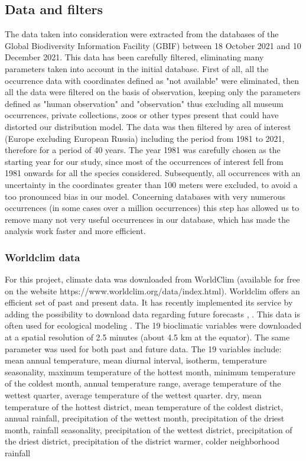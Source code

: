 \documentclass[12pt,a4paper]{article}
\begin{document}
\subsection{Data and filters}
The data taken into consideration were extracted from the databases of the Global Biodiversity Information Facility (GBIF) \citep{gbif} between 18 October 2021 and 10 December 2021.
This data has been carefully filtered, eliminating many parameters taken into account in the initial database.
First of all, all the occurrence data with coordinates defined as "not available" were eliminated, then all the data were filtered on the basis of observation, keeping only the parameters defined as "human observation" and "observation" thus excluding all museum occurrences, private collections, zoos or other types present that could have distorted our distribution model.
The data was then filtered by area of interest (Europe excluding European Russia) including the period from 1981 to 2021, therefore for a period of 40 years.
The year 1981 was carefully chosen as the starting year for our study, since most of the occurrences of interest fell from 1981 onwards for all the species considered.
Subsequently, all occurrences with an uncertainty in the coordinates greater than 100 meters were excluded, to avoid a too pronounced bias in our model.
Concerning databases with very numerous occurrences (in some cases over a million occurrences) this step has allowed us to remove many not very useful occurrences in our database, which has made the analysis work faster and more efficient.

\subsubsection{Worldclim data}

For this project, climate data was downloaded from WorldClim (available for free on the website https://www.worldclim.org/data/index.html).
Worldclim offers an efficient set of past and present data. It has recently implemented its service by adding the possibility to download data regarding future forecasts \citep{wc}, \citep{ey}. This data is often used for ecological modeling \citep{bcw}. 
The 19 bioclimatic variables were downloaded at a spatial resolution of 2.5 minutes (about 4.5 km at the equator). The same parameter was used for both past and future data.
The 19 variables include: mean annual temperature, mean diurnal interval, isotherm, temperature seasonality, maximum temperature of the hottest month, minimum temperature of the coldest month, annual temperature range, average temperature of the wettest quarter, average temperature of the wettest quarter. dry, mean temperature of the hottest district, mean temperature of the coldest district, annual rainfall, precipitation of the wettest month, precipitation of the driest month, rainfall seasonality, precipitation of the wettest district, precipitation of the driest district, precipitation of the district warmer, colder neighborhood rainfall 
\end{document}
